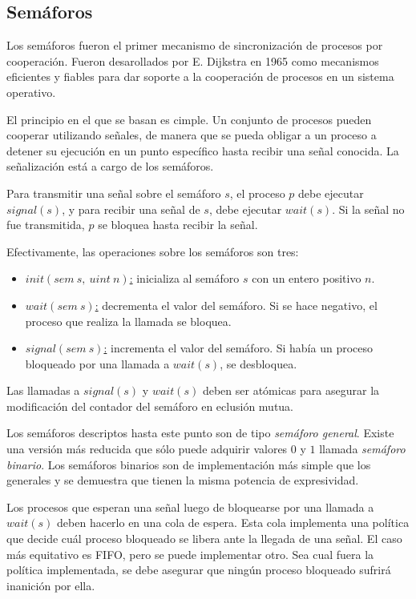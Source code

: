 \subsection{Semáforos}
\label{semaforos}

Los semáforos fueron el primer mecanismo de sincronización de procesos por
cooperación. Fueron desarollados por E. Dijkstra en 1965 como mecanismos
eficientes y fiables para dar soporte a la cooperación de procesos en un sistema
operativo.

El principio en el que se basan es cimple. Un conjunto de procesos pueden
cooperar utilizando señales, de manera que se pueda obligar a un proceso a
detener su ejecución en un punto específico hasta recibir una señal conocida.
La señalización está a cargo de los semáforos.

Para transmitir una señal sobre el semáforo $s$, el proceso $p$ debe ejecutar
$signal(s)$, y para recibir una señal de $s$, debe ejecutar $wait(s)$. Si la
señal no fue transmitida, $p$ se bloquea hasta recibir la señal.

Efectivamente, las operaciones sobre los semáforos son tres:
\begin{itemize}
    \item \underline{$init(sem\ s,\ uint\ n)$:} inicializa al semáforo $s$ con
    un entero positivo $n$.
    \item \underline{$wait(sem\ s)$:} decrementa el valor del semáforo. Si se
    hace negativo, el proceso que realiza la llamada se bloquea.
    \item \underline{$signal(sem\ s)$:} incrementa el valor del semáforo. Si
    había un proceso bloqueado por una llamada a $wait(s)$, se desbloquea.
\end{itemize}

Las llamadas a $signal(s)$ y $wait(s)$ deben ser atómicas para asegurar la
modificación del contador del semáforo en eclusión mutua.

Los semáforos descriptos hasta este punto son de tipo \textit{semáforo
general}.
Existe una versión más reducida que sólo puede adquirir valores $0$ y $1$ llamada
\textit{semáforo binario}. Los semáforos binarios son de implementación más
simple que los generales y se demuestra que tienen la misma potencia de
expresividad. \cite{SistOpStallings}

Los procesos que esperan una señal luego de bloquearse por una llamada a
$wait(s)$ deben hacerlo en una cola de espera. Esta cola implementa una política
que decide cuál proceso bloqueado se libera ante la llegada de una señal. El
caso más equitativo es FIFO, pero se puede implementar otro. Sea cual fuera la
política implementada, se debe asegurar que ningún proceso bloqueado sufrirá
inanición por ella.

